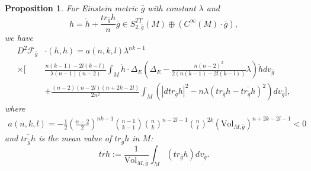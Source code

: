 \documentclass[12pt]{amsart}
\newtheorem{proposition}{Proposition}[section]
\newcommand{\bg}{\bar{g}}
\numberwithin{equation}{section}
\begin{document}
\begin{proposition}\label{Proposition: 2nd_variation_of_functional}
For Einstein metric $\bg$ with constant $\lambda$ and $$h = \mathring{h} + \frac{tr_{\bg}h}{n} \bg \in S^{TT}_{2,\bg}(M) \oplus(C^\infty(M) \cdot\bg),$$ we have 
\begin{equation*}
\begin{split}
    D^2\mathcal{F}_{\bg}& \cdot(h,h) =a(n,k,l)\lambda^{nk-1}\\
    \times\bigg[&\frac{n(k-1)-2l(k-l)}{\lambda(n-1)(n-2)}\int_M\mathring{h} \cdot \Delta_E \left(\Delta_E-\frac{n(n-2)^2}{2\left(n(k-1)-2l(k-l)\right)}\lambda\right) \mathring{h} dv_{\bg}\\
    &+\frac{(n-2)(n-2l)(n+2k-2l)}{2n^2} \int_M \left(|dtr_{\bg}h|^2-n\lambda \left(tr_{\bg} h-\overline{tr_{\bg}h} \right)^2\right)dv_{\bg}\bigg],
\end{split}
\end{equation*}
where 
\begin{align*}
    a(n,k,l) = -\frac{1}{2}\left(\frac{n-2}{2}\right)^{nk-1} \binom{n-1}{k-1} \binom{n}{k}^{n-2l-1} \binom{n}{l}^{2k} \left( \mathrm{Vol}_{M,\bg} \right)^{n+2k-2l-1} < 0
\end{align*}
and $\overline{tr_{\bg}h}$ is the mean value of $tr_{\bg}h$ in $M$:
\begin{equation*}
    \overline{trh}:=\frac{1}{\mathrm{Vol}_{M,\bg}}\int_M \left( tr_{\bg}h \right) dv_{\bg}.
\end{equation*}
\end{proposition}
\end{document}
